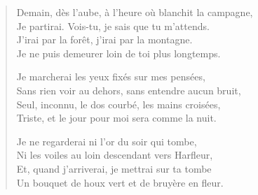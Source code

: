 \begin{verse}
Demain, dès l'aube, à l'heure où blanchit la campagne,\\
Je partirai. Vois-tu, je sais que tu m'attends.\\
J'irai par la forêt, j'irai par la montagne.\\
Je ne puis demeurer loin de toi plus longtemps.

Je marcherai les yeux fixés sur mes pensées,\\
Sans rien voir au dehors, sans entendre aucun bruit,\\
Seul, inconnu, le dos courbé, les mains croisées,\\
Triste, et le jour pour moi sera comme la nuit.

Je ne regarderai ni l'or du soir qui tombe,\\
Ni les voiles au loin descendant vers Harfleur,\\
Et, quand j'arriverai, je mettrai sur ta tombe\\
Un bouquet de houx vert et de bruyère en fleur.

\end{verse}
